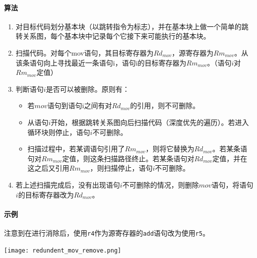 \paragraph*{算法}
\begin{enumerate}
\item 对目标代码划分基本块（以跳转指令为标志），并在基本块上做一个简单的跳转关系图，每个基本块中记录每个它接下来可能执行的基本块。
\item 扫描代码。对每个mov语句，其目标寄存器为$Rd_{mov}$，源寄存器为$Rm_{mov}$。从该条语句向上寻找最近一条语句i，语句i的目标寄存器为$Rm_{mov}$。（语句$i$对$Rm_{mov}$定值）
\item 判断语句$i$是否可以被删除。原则有：
	\begin{itemize}
		\item 若$mov$语句到语句i之间有对$Rd_{mov}$的引用，则不可删除。
		\item 从语句$i$开始，根据跳转关系图向后扫描代码（深度优先的遍历）。若进入循环块则停止，语句$i$不可删除。
		\item 扫描过程中，若某调语句引用了$Rm_{mov}$，则将它替换为$Rd_{mov}$。若某条语句对$Rm_{mov}$定值，则这条扫描路径终止。若某条语句对$Rd_{mov}$定值，并在这之后又引用$Rm_{mov}$，则扫描停止，语句$i$不可删除。
	\end{itemize}
\item 若上述扫描完成后，没有出现语句$i$不可删除的情况，则删除$mov$语句，将语句$i$的目标寄存器改为$Rd_{mov}$。
\end{enumerate}

\paragraph*{示例}
注意到在进行消除后，使用\verb|r4|作为源寄存器的\verb|add|语句改为使用\verb|r5|。
\begin{center}
\texttt{[image: redundent\_mov\_remove.png]}
\end{center}

